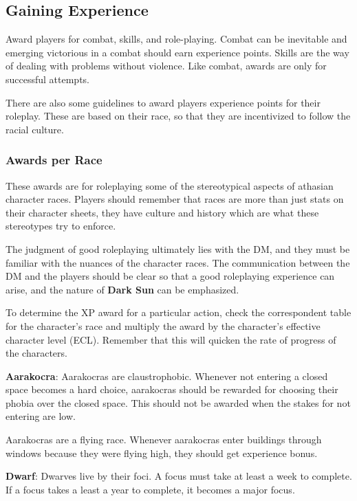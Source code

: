 \subsection{Gaining Experience}
Award players for combat, skills, and role-playing. Combat can be inevitable and emerging victorious in a combat should earn experience points. Skills are the way of dealing with problems without violence. Like combat, awards are only for successful attempts.

There are also some guidelines to award players experience points for their roleplay. These are based on their race, so that they are incentivized to follow the racial culture.

\subsubsection{Awards per Race}
These awards are for roleplaying some of the stereotypical aspects of athasian character races. Players should remember that races are more than just stats on their character sheets, they have culture and history which are what these stereotypes try to enforce.

The judgment of good roleplaying ultimately lies with the DM, and they must be familiar with the nuances of the character races. The communication between the DM and the players should be clear so that a good roleplaying experience can arise, and the nature of \textbf{Dark Sun} can be emphasized.

To determine the XP award for a particular action, check the correspondent table for the character's race and multiply the award by the character's effective character level (ECL). Remember that this will quicken the rate of progress of the characters.

\textbf{Aarakocra}: Aarakocras are claustrophobic. Whenever not entering a closed space becomes a hard choice, aarakocras should be rewarded for choosing their phobia over the closed space. This should not be awarded when the stakes for not entering are low.

Aarakocras are a flying race. Whenever aarakocras enter buildings through windows because they were flying high, they should get experience bonus.


\textbf{Dwarf}: Dwarves live by their foci. A focus must take at least a week to complete. If a focus takes a least a year to complete, it becomes a major focus.

